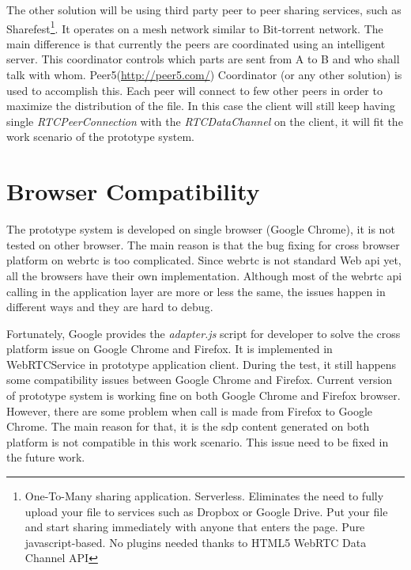 \par The other solution will be using third party peer to peer sharing services, such as Sharefest\footnote{One-To-Many sharing application. Serverless. Eliminates the need to fully upload your file to services such as Dropbox or Google Drive. Put your file and start sharing immediately with anyone that enters the page. Pure javascript-based. No plugins needed thanks to HTML5 WebRTC Data Channel API}. It operates on a mesh network similar to Bit-torrent network. The main difference is that currently the peers are coordinated using an intelligent server. This coordinator controls which parts are sent from A to B and who shall talk with whom. Peer5(\url{http://peer5.com/}) Coordinator (or any other solution) is used to accomplish this. Each peer will connect to few other peers in order to maximize the distribution of the file.\cite{github:sharefest} In this case the client will still keep having single \textit{RTCPeerConnection} with the \textit{RTCDataChannel} on the client, it will fit the work scenario of the prototype system.

\section{Browser Compatibility}

\par The prototype system is developed on single browser (Google Chrome), it is not tested on other browser. The main reason is that the bug fixing for cross browser platform on \gls{webrtc} is too complicated. Since \gls{webrtc} is not standard Web \gls{api} yet, all the browsers have their own implementation. Although most of the \gls{webrtc} \gls{api} calling in the application layer are more or less the same, the issues happen in different ways and they are hard to debug.

\par Fortunately, Google provides the \textit{adapter.js} script for developer to solve the cross platform issue on Google Chrome and Firefox. It is implemented in WebRTCService in prototype application client. During the test, it still happens some compatibility issues between Google Chrome and Firefox. Current version of prototype system is working fine on both Google Chrome and Firefox browser. However, there are some problem when call is made from Firefox to Google Chrome. The main reason for that, it is the \gls{sdp} content generated on both platform is not compatible in this work scenario. This issue need to be fixed in the future work.

